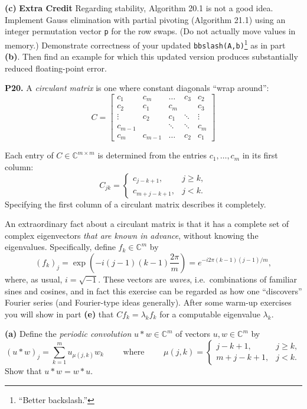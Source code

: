 \documentclass[12pt]{amsart}
\newcommand{\CC}{\mathbb{C}}
\newcommand{\prob}[1]{\bigskip\noindent\textbf{#1.}\quad }
\newcommand{\epart}[1]{\medskip\noindent\textbf{(#1)}\quad }
\begin{document}
\epart{c}  \textbf{Extra Credit} \quad Regarding stability, Algorithm 20.1 is not a good idea.  Implement Gauss elimination with partial pivoting (Algorithm 21.1) using an integer permutation vector \texttt{p} for the row swaps.  (Do not actually move values in memory.)  Demonstrate correctness of your updated \verb|bbslash(A,b)|\footnote{``Better backslash.''} as in part \textbf{(b)}.  Then find an example for which this updated version produces substantially reduced floating-point error.


\prob{P20}   A \emph{circulant matrix} is one where constant diagonals ``wrap around'':
\begin{equation} \label{circuC}
C = \begin{bmatrix}
	c_1 & c_{m} & \dots & c_3 & c_2 \\
	c_2 & c_1 & c_{m} & & c_3 \\
	\vdots & c_2 & c_1 & \ddots & \vdots \\
	c_{m-1} & & \ddots & \ddots & c_{m} \\
	c_{m} & c_{m-1} & \dots & c_2 & c_1
	\end{bmatrix}
\end{equation}
\smallskip

\noindent Each entry of $C \in \CC^{m\times m}$ is determined from the entries $c_1, \dots, c_{m}$ in its first column:
	$$C_{jk} = \begin{cases}
	c_{j-k + 1}, & j \ge k, \\
	c_{m + j-k + 1}, & j < k.
	\end{cases}$$
Specifying the first column of a circulant matrix describes it completely.

An extraordinary fact about a circulant matrix is that it has a complete set of complex eigenvectors \emph{that are known in advance}, without knowing the eigenvalues.  Specifically, define $f_k \in \CC^m$ by
\begin{equation}
(f_k)_j = \exp\left(-i(j-1) (k-1) \frac{2\pi}{m}\right) = e^{-i 2\pi (k-1)(j-1)/m}, \label{circulantev}
\end{equation}
where, as usual, $i=\sqrt{-1}$.  These vectors are \emph{waves}, i.e.~combinations of familiar sines and cosines, and in fact this exercise can be regarded as how one ``discovers'' Fourier series (and Fourier-type ideas generally).  After some warm-up exercises you will show in part \textbf{(e)} that $C f_k = \lambda_k f_k$ for a computable eigenvalue $\lambda_k$.

\epart{a}  Define the \emph{periodic convolution} $u \ast w\in \CC^m$ of vectors $u,w\in \CC^m$ by
	$$(u\ast w)_j = \sum_{k=1}^m u_{\mu(j,k)} w_k \qquad \text{ where } \qquad \mu(j,k) = \begin{cases}
	j-k + 1, & j \ge k, \\
	m + j-k + 1, & j < k.
	\end{cases}$$
Show that $u\ast w = w\ast u$.
\end{document}
